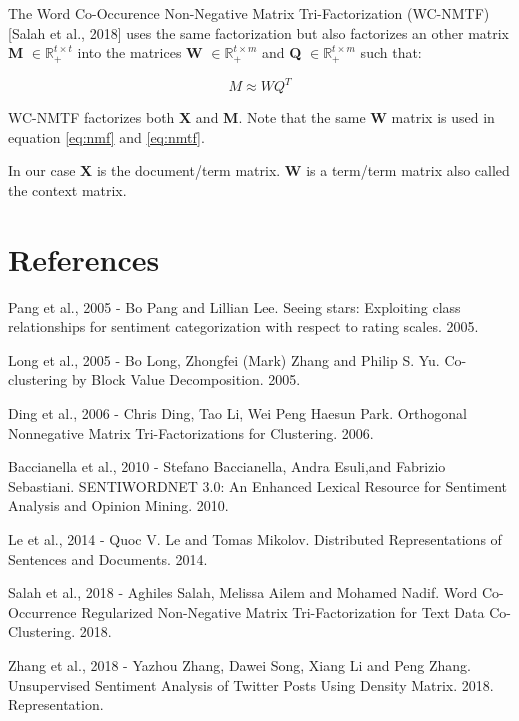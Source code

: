 \documentclass{article}
\begin{document}
The Word Co-Occurence Non-Negative Matrix Tri-Factorization (WC-NMTF) [Salah et al., 2018] uses the same factorization but also factorizes an other matrix \textbf{M} $\in \mathbb{R}^{t \times t}_{+}$ into the matrices \textbf{W} $\in \mathbb{R}^{t \times m}_{+}$ and \textbf{Q} $\in \mathbb{R}^{t \times m}_{+}$ such that:

\begin{equation}
M \approx WQ^{T}
\label{eq:nmtf}
\end{equation}

WC-NMTF factorizes both \textbf{X} and \textbf{M}. Note that the same \textbf{W} matrix is used in equation \ref{eq:nmf} and \ref{eq:nmtf}.

In our case \textbf{X} is the document/term matrix. \textbf{W} is a term/term matrix also called the context matrix.



\section*{References}

\begin{list_type}  
\item [Pang et al., 2005] - Bo Pang and Lillian Lee. Seeing stars: Exploiting class relationships for sentiment categorization with respect to rating scales. 2005.
\item [Long et al., 2005] - Bo Long, Zhongfei (Mark) Zhang and Philip S. Yu. Co-clustering by Block Value Decomposition. 2005.
\item [Ding et al., 2006] - Chris Ding, Tao Li, Wei Peng Haesun Park. Orthogonal Nonnegative Matrix Tri-Factorizations for Clustering. 2006.
\item [Baccianella et al., 2010] - Stefano Baccianella, Andra Esuli,and Fabrizio Sebastiani. SENTIWORDNET 3.0: An Enhanced Lexical Resource for Sentiment Analysis and Opinion Mining. 2010.
\item [Le et al., 2014] - Quoc V. Le and Tomas Mikolov. Distributed Representations of Sentences and Documents. 2014.
\item [Salah et al., 2018] - Aghiles Salah, Melissa Ailem and Mohamed Nadif. Word Co-Occurrence Regularized Non-Negative Matrix Tri-Factorization for Text Data Co-Clustering. 2018.
\item [Zhang et al., 2018] - Yazhou Zhang, Dawei Song, Xiang Li and Peng Zhang. Unsupervised Sentiment Analysis
of Twitter Posts Using Density Matrix. 2018.
Representation.
\end{list_type}
\end{document}
